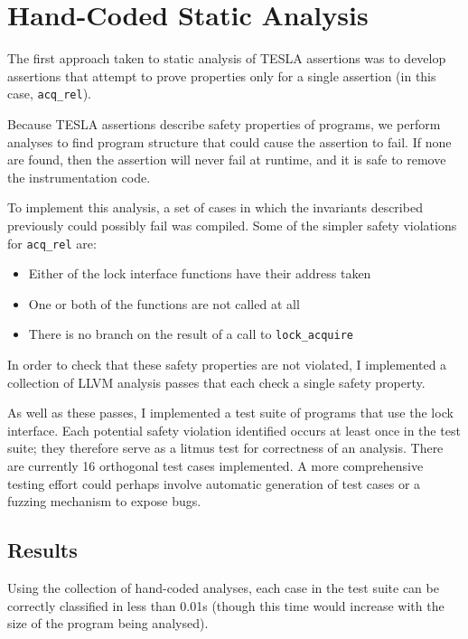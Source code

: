 \section{Hand-Coded Static Analysis} \label{sec:hand-coded}

The first approach taken to static analysis of TESLA assertions was to develop
 assertions that attempt to prove properties only for a
single assertion (in this case, \texttt{acq_rel}).

Because TESLA assertions describe safety properties of programs, we
perform analyses to find program structure that could cause the
assertion to fail. If none are found, then the assertion will never fail
at runtime, and it is safe to remove the instrumentation code.

To implement this analysis, a set of cases in which the invariants described
previously could possibly fail was compiled. Some of the simpler safety
violations for \texttt{acq_rel} are:
\begin{itemize}
  \item Either of the lock interface functions have their address taken
  \item One or both of the functions are not called at all
  \item There is no branch on the result of a call to
  \texttt{lock_acquire}
\end{itemize}

In order to check that these safety properties are not violated, I implemented a
collection of LLVM \cite{lattner_llvm:_2002} analysis passes that each check a
single safety property. 

As well as these passes, I implemented a test suite of programs that use
the lock interface. Each potential safety violation identified occurs at
least once in the test suite; they therefore serve as a litmus test for
correctness of an analysis. There are currently 16 orthogonal test cases
implemented. A more comprehensive testing effort could perhaps involve
automatic generation of test cases or a fuzzing mechanism to expose
bugs.

\subsection{Results}

Using the collection of hand-coded analyses, each case in the test suite
can be correctly classified in less than \num{0.01}\si{\second} (though
this time would increase with the size of the program being analysed).

